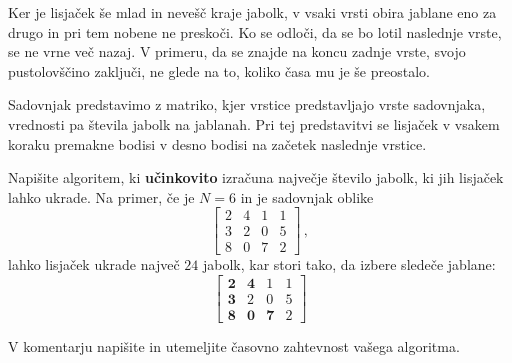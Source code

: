 \documentclass[arhiv]{../izpit}
\begin{document}
Ker je lisjaček še mlad in nevešč kraje jabolk, v vsaki vrsti obira
jablane eno za drugo in pri tem nobene ne preskoči. Ko se odloči, da se bo
lotil naslednje vrste, se ne vrne več nazaj. V primeru, da se znajde na koncu
zadnje vrste, svojo pustolovščino zaključi, ne glede na to, koliko časa mu je še preostalo.

Sadovnjak predstavimo z matriko, kjer vrstice predstavljajo
vrste sadovnjaka, vrednosti pa števila jabolk na jablanah.
Pri tej predstavitvi se lisjaček v vsakem koraku premakne bodisi v desno bodisi
na začetek naslednje vrstice.

\podnaloga
  Napišite algoritem, ki \textbf{učinkovito} izračuna največje število jabolk, ki jih lisjaček
  lahko ukrade. Na primer, če je $N = 6$ in je sadovnjak oblike
  \[
  \begin{bmatrix}
      2 & 4 & 1 & 1 \\
      3 & 2 & 0 & 5 \\
      8 & 0 & 7 & 2
  \end{bmatrix}\,,
  \]
  lahko lisjaček ukrade največ $24$ jabolk, kar stori tako, da izbere sledeče jablane:
  \[
  \begin{bmatrix}
      \textbf{2} & \textbf{4} & 1 & 1 \\
      \textbf{3} & 2 & 0 & 5 \\
      \textbf{8} & \textbf{0} & \textbf{7} & 2
  \end{bmatrix}
  \]

  \podnaloga
  V komentarju napišite in utemeljite časovno zahtevnost vašega algoritma.
\end{document}
